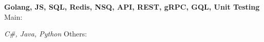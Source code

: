 \begin{cventries}

    
\cventry
    {\textbf{Golang, JS, SQL, Redis, NSQ, API, REST, gRPC, GQL, Unit Testing} }
    {Main:}
    {}
    {}
    {
        \iffalse
        \begin{cvitems}
            \item Languages: Go, PHP, C\#, HTML/CSS, Javascript. 
            \item MySQL, ASP.Net, Postman, Apache Tomcat, Linux.
            \item Web services, REST APIs, Auths, SQL, Unit testing.
        \end{cvitems}
        \fi
    }


\cventry
    {\textit{C\#, Java, Python} }
    {Others:}
    {}
    {}
    {
        \iffalse
        \begin{cvitems}
            \item Nodejs/expressjs, Java, Python, Laravel, Wordpress, Jekyll.
        \end{cvitems}
        \fi
    }
\end{cventries}
